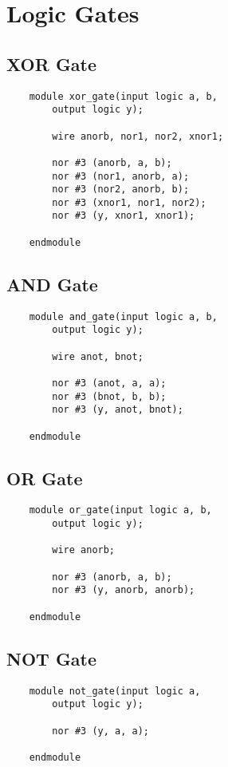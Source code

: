\documentclass[../main]{subfiles}
\begin{document}
\section {Logic Gates}

\subsection {XOR Gate}

\begin{verbatim}
    module xor_gate(input logic a, b,
        output logic y);

        wire anorb, nor1, nor2, xnor1;

        nor #3 (anorb, a, b);
        nor #3 (nor1, anorb, a);
        nor #3 (nor2, anorb, b);
        nor #3 (xnor1, nor1, nor2);
        nor #3 (y, xnor1, xnor1);

    endmodule
\end{verbatim}

\subsection {AND Gate}

\begin{verbatim}
    module and_gate(input logic a, b,
        output logic y);

        wire anot, bnot;

        nor #3 (anot, a, a);
        nor #3 (bnot, b, b);
        nor #3 (y, anot, bnot);

    endmodule
\end{verbatim}

\subsection {OR Gate}

\begin{verbatim}
    module or_gate(input logic a, b,
        output logic y);

        wire anorb;

        nor #3 (anorb, a, b);
        nor #3 (y, anorb, anorb);

    endmodule
\end{verbatim}

\subsection {NOT Gate}

\begin{verbatim}
    module not_gate(input logic a,
        output logic y);

        nor #3 (y, a, a);

    endmodule
\end{verbatim}
\end{document}

